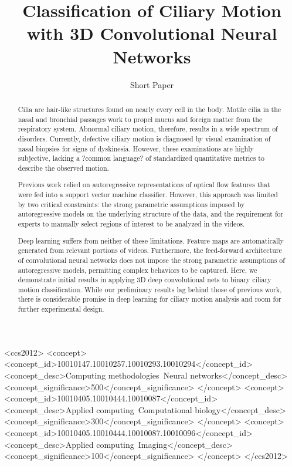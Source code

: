 \documentclass[sigconf]{acmart}
\begin{document}
\title{Classification of Ciliary Motion with 3D Convolutional Neural Networks}
\subtitle{Short Paper}


\begin{abstract}
Cilia are hair-like structures found on nearly every cell in the body. Motile cilia in the nasal and bronchial passages work to propel mucus and foreign matter from the respiratory system. Abnormal ciliary motion, therefore, results in a wide spectrum of disorders. Currently, defective ciliary motion is diagnosed by visual examination of nasal biopsies for signs of dyskinesia. However, these examinations are highly subjective, lacking a ?common language? of standardized quantitative metrics to describe the observed motion.

Previous work relied on autoregressive representations of optical flow features that were fed into a support vector machine classifier. However, this approach was limited by two critical constraints: the strong parametric assumptions imposed by autoregressive models on the underlying structure of the data, and the requirement for experts to manually select regions of interest to be analyzed in the videos.

Deep learning suffers from neither of these limitations. Feature maps are automatically generated from relevant portions of videos. Furthermore, the feed-forward architecture of convolutional neural networks does not impose the strong parametric assumptions of autoregressive models, permitting complex behaviors to be captured. Here, we demonstrate initial results in applying 3D deep convolutional nets to binary ciliary motion classification. While our preliminary results lag behind those of previous work, there is considerable promise in deep learning for ciliary motion analysis and room for further experimental design.

\end{abstract}

%
%
\begin{CCSXML}
<ccs2012>
<concept>
<concept_id>10010147.10010257.10010293.10010294</concept_id>
<concept_desc>Computing methodologies~Neural networks</concept_desc>
<concept_significance>500</concept_significance>
</concept>
<concept>
<concept_id>10010405.10010444.10010087</concept_id>
<concept_desc>Applied computing~Computational biology</concept_desc>
<concept_significance>300</concept_significance>
</concept>
<concept>
<concept_id>10010405.10010444.10010087.10010096</concept_id>
<concept_desc>Applied computing~Imaging</concept_desc>
<concept_significance>100</concept_significance>
</concept>
</ccs2012>
\end{CCSXML}
\end{document}
